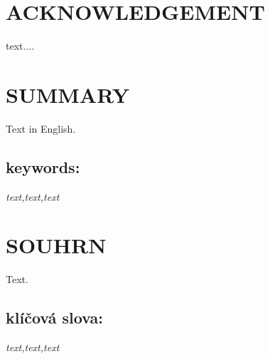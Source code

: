 \newpage
 

\newpage



\newpage
\thispagestyle{empty}

\vspace*{\fill}
\section*{ACKNOWLEDGEMENT}
\mbox
\indent text....





\newpage
\thispagestyle{empty}

\section*{SUMMARY}
Text in English.


\subsection*{keywords:}
\textit{text,text,text}

\bigskip %

\section*{SOUHRN}
Text.



\subsection*{klíčová slova:}
\textit{text,text,text}


\newpage
\thispagestyle{empty}
\tableofcontents

